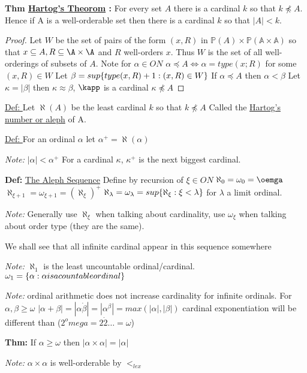 \textbf{Thm \underline{Hartog's Theorom} : } For every set $A$ there is a cardinal $k$ so that $k \npreceq A.$
Hence if A is a well-orderable set then there is a cardinal $k$ so that $|A| < k$.

\begin{proof}
    Let $W$ be the set of pairs of the form $(x,R)$ in $\mathbb{P}(A) \times \mathbb{P(A \times A)}$ so that $x \subseteq A, R \subseteq \A \times \A$
    and $R$ well-orders $x$.
    Thus $W$ is the set of all well-orderings of subsets of $A$.
    Note for $\alpha \in ON$
    $\alpha \preceq A \iff \alpha = type(x;R)$ for some $(x,R) \in W$
    Let $\beta = sup \{type(x,R) + 1 : (x,R) \in W\}$
    If $\alpha \preceq A$ then $\alpha < \beta$
    Let $\kappa = |\beta|$ then $\kappa \approx \beta$, $\kapp$ is a cardinal
    $\kappa \npreceq A$
\end{proof}

\underline{Def: } Let $\aleph(A)$ be the least cardinal $k$ so that $k \npreceq A$
Called the \underline{Hartog's number or aleph} of A.

\underline{Def: } For an ordinal $\alpha$ let $\alpha^+ = \aleph(\alpha)$

\emph{Note: } $|\alpha| < \alpha^+$
For a cardinal $\kappa$, $\kappa^+$ is the next biggest cardinal.

\textbf{Def: } \underline{The Aleph Sequence}
Define by recursion of $\xi \in ON$
$\aleph_0 = \omega_0 = \oemga$
$\aleph_{\xi+1} = \omega_{\xi + 1} = (\aleph_\xi)^+$
$\aleph_\lambda = \omega_\lambda = sup \{\aleph_\xi : \xi < \lambda\}$ for $\lambda$ a limit ordinal.

\emph{Note:} Generally use $\aleph_\xi$ when talking about cardinality, use $\omega_\xi$ when talking about order type (they are the same).

We shall see that all infinite cardinal appear in this sequence somewhere

\emph{Note:} $\aleph_1$ is the least uncountable ordinal/cardinal.
$\omega_1 = \{\alpha : \alpha is a countable ordinal\}$

\emph{Note:} ordinal arithmetic does not increase cardinality for infinite ordinals.
For $\alpha, \beta \geq \omega$
$|\alpha + \beta| = |\alpha \dot \beta| = |\alpha^\beta| = max(|\alpha|,|\beta|)$
cardinal exponentiation will be different than ($2^omega = 2 \dot 2 \dots = \omega$)

\textbf{Thm:} If $\alpha \geq \omega$ then $|\alpha \times \alpha| = |\alpha|$

\emph{Note:} $\alpha \times \alpha$ is well-orderable by $<_{lex}$

